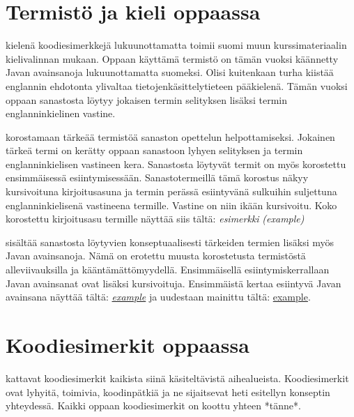 \documentclass{tufte-book}
\newcommand{\eng}[1]{\textit{(#1)}}
\newcommand{\newnogls}[1]{\textit{#1}}
\newcommand{\newengnogls}[2]{\newnogls{#1} \eng{#2}}
\newcommand{\javanogls}[1]{\underline{#1}}
\newcommand{\newjavanogls}[1]{\textit{\javanogls{#1}}}
\begin{document}

\section{Termistö ja kieli oppaassa}
\label{kielestä}

 kielenä koodiesimerkkejä lukuunottamatta toimii suomi muun
kurssimateriaalin kielivalinnan mukaan. Oppaan käyttämä termistö on tämän vuoksi käännetty Javan
avainsanoja lukuunottamatta suomeksi. Olisi kuitenkaan turha kiistää englannin ehdotonta ylivaltaa
tietojenkäsittelytieteen pääkielenä. Tämän vuoksi oppaan sanastosta löytyy jokaisen termin
selityksen lisäksi termin englanninkielinen vastine.

 korostamaan tärkeää termistöä sanaston opettelun helpottamiseksi.
Jokainen tärkeä termi on kerätty oppaan sanastoon lyhyen selityksen ja termin englanninkielisen
vastineen kera. Sanastosta löytyvät termit on myös korostettu ensimmäisessä esiintymisessään.
Sanastotermeillä tämä korostus näkyy kursivoituna kirjoitusasuna ja termin perässä esiintyvänä
sulkuihin suljettuna englanninkielisenä vastineena termille. Vastine on niin ikään kursivoitu.
Koko korostettu kirjoitusasu termille näyttää siis tältä: \newengnogls{esimerkki}{example}

 sisältää sanastosta löytyvien konseptuaalisesti tärkeiden termien
lisäksi myös Javan avainsanoja. Nämä on erotettu muusta korostetusta termistöstä alleviivauksilla
ja kääntämättömyydellä. Ensimmäisellä esiintymiskerrallaan Javan avainsanat ovat lisäksi
kursivoituja. Ensimmäistä kertaa esiintyvä Javan avainsana näyttää tältä: \newjavanogls{example}
ja uudestaan mainittu tältä: \javanogls{example}.


\section{Koodiesimerkit oppaassa}
\label{koodiesimerkeistä}

 kattavat koodiesimerkit kaikista siinä käsiteltävistä aihealueista.
Koodiesimerkit ovat lyhyitä, toimivia, koodinpätkiä ja ne sijaitsevat heti esitellyn konseptin
yhteydessä. Kaikki oppaan koodiesimerkit on koottu yhteen *tänne*. %
\end{document}
